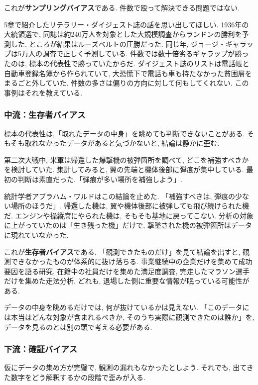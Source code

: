 これが\textbf{サンプリングバイアス}である. 件数で殴って解決できる問題ではない.

5章で紹介したリテラリー・ダイジェスト誌の話を思い出してほしい.
1936年の大統領選で, 同誌は約240万人を対象とした大規模調査からランドンの勝利を予測した.
ところが結果はルーズベルトの圧勝だった. 同じ年, ジョージ・ギャラップは5万人の調査で正しく予測している.
件数では数十倍劣るギャラップが勝ったのは, 標本の代表性で勝っていたからだ.
ダイジェスト誌のリストは電話帳と自動車登録名簿から作られていて, 大恐慌下で電話も車も持たなかった貧困層をまるごと外していた.
件数の多さは偏りの方向に対して何もしてくれない. この事例はそれを教えている.

\subsubsection*{中流：生存者バイアス}

標本の代表性は,「取れたデータの中身」を眺めても判断できないことがある.
そもそも取れなかったデータがあると気づかないと, 結論は静かに歪む.

第二次大戦中, 米軍は帰還した爆撃機の被弾箇所を調べて, どこを補強すべきかを検討していた.
集計してみると, 翼の先端と機体後部に弾痕が集中している.
最初の判断は素直だった.「弾痕が多い場所を補強しよう」.

統計学者アブラハム・ワルドはこの結論を止めた.
「補強すべきは, 弾痕の少ない場所のほうだ」.
帰還した機は, 翼や機体後部に被弾しても飛び続けられた機だ.
エンジンや操縦席にやられた機は, そもそも基地に戻ってこない.
分析の対象に上がっていたのは「生き残った機」だけで, 撃墜された機の被弾箇所はデータに現れていなかった.

これが\textbf{生存者バイアス}である.
「観測できたものだけ」を見て結論を出すと, 観測できなかったものが体系的に抜け落ちる.
事業継続中の企業だけを集めて成功要因を語る研究, 在籍中の社員だけを集めた満足度調査, 完走したマラソン選手だけを集めた走法分析.
どれも, 退場した側に重要な情報が眠っている可能性がある.

データの中身を眺めるだけでは, 何が抜けているかは見えない.
「このデータには本当はどんな対象が含まれるべきか, そのうち実際に観測できたのは誰か」を, データを見るのとは別の頭で考える必要がある.

\subsubsection*{下流：確証バイアス}

仮にデータの集め方が完璧で, 観測の漏れもなかったとしよう.
それでも, 出てきた数字をどう解釈するかの段階で歪みが入る.

